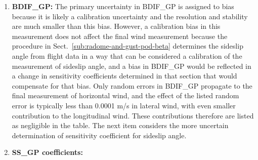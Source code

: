 \documentclass[12pt,twoside,english]{article}\usepackage[]{graphicx}\usepackage[]{color}
\let\OrgIndex\index
\renewcommand*{\index}[1]{\OrgIndex{#1}}
\begin{document}
\begin{enumerate}
\item \textbf{BDIF\_GP:} 
The primary uncertainty in BDIF\_GP is assigned to bias because it is likely a calibration uncertainty and the resolution and stability are much smaller than this bias. However, a calibration bias in this measurement does not affect the final wind measurement because the procedure in Sect.~\ref{sub:radome-and-gust-pod-beta} determines the sideslip angle from flight data in a way that can be considered a calibration of the measurement of sideslip angle, and a bias in BDIF\_GP would be reflected in a change in sensitivity coefficients determined in that section that would compensate for that bias. Only random errors in BDIF\_GP propagate to the final measurement of horizontal wind, and the effect of the listed random error is typically less than 0.0001 m/s in lateral wind, with even smaller contribution to the longitudinal wind. These contributions therefore are listed as negligible in the table. The next item considers the more uncertain determination of sensitivity coefficient for sideslip angle.  
\item \textbf{SS\_GP coefficients:} 

\end{enumerate}
\end{document}
